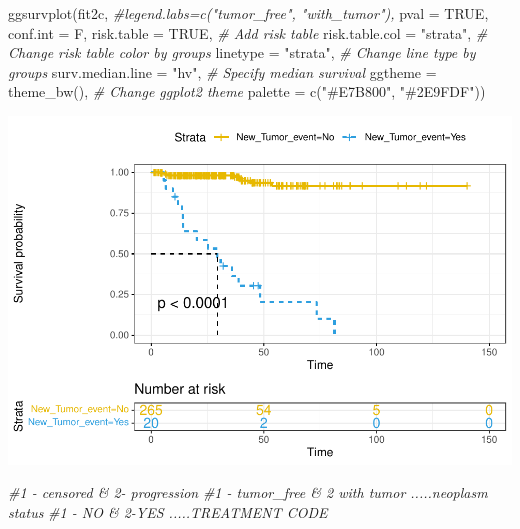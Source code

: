 \documentclass[
  11pt,
]{article}
\newenvironment{Shaded}{\begin{snugshade}}{\end{snugshade}}
\newcommand{\AttributeTok}[1]{\textcolor[rgb]{0.77,0.63,0.00}{#1}}
\newcommand{\CommentTok}[1]{\textcolor[rgb]{0.56,0.35,0.01}{\textit{#1}}}
\newcommand{\ConstantTok}[1]{\textcolor[rgb]{0.00,0.00,0.00}{#1}}
\newcommand{\FunctionTok}[1]{\textcolor[rgb]{0.00,0.00,0.00}{#1}}
\newcommand{\NormalTok}[1]{#1}
\newcommand{\StringTok}[1]{\textcolor[rgb]{0.31,0.60,0.02}{#1}}
\begin{document}
\begin{Shaded}
\begin{Highlighting}[]
\FunctionTok{ggsurvplot}\NormalTok{(fit2c,}
          \CommentTok{\#legend.labs=c("tumor\_free", "with\_tumor"),}
          \AttributeTok{pval =} \ConstantTok{TRUE}\NormalTok{, }\AttributeTok{conf.int =}\NormalTok{ F,}
          \AttributeTok{risk.table =} \ConstantTok{TRUE}\NormalTok{, }\CommentTok{\# Add risk table}
          \AttributeTok{risk.table.col =} \StringTok{"strata"}\NormalTok{, }\CommentTok{\# Change risk table color by groups}
          \AttributeTok{linetype =} \StringTok{"strata"}\NormalTok{, }\CommentTok{\# Change line type by groups}
          \AttributeTok{surv.median.line =} \StringTok{"hv"}\NormalTok{, }\CommentTok{\# Specify median survival}
          \AttributeTok{ggtheme =} \FunctionTok{theme\_bw}\NormalTok{(), }\CommentTok{\# Change ggplot2 theme}
          \AttributeTok{palette =} \FunctionTok{c}\NormalTok{(}\StringTok{"\#E7B800"}\NormalTok{, }\StringTok{"\#2E9FDF"}\NormalTok{))}
\end{Highlighting}
\end{Shaded}

\includegraphics{new_surv_3_files/figure-latex/unnamed-chunk-10-1.pdf}

\begin{Shaded}
\begin{Highlighting}[]
\CommentTok{\#1 {-} censored \& 2{-} progression}
\CommentTok{\#1 {-} tumor\_free \& 2 with tumor .....neoplasm status }
\CommentTok{\#1 {-} NO \& 2{-}YES .....TREATMENT CODE}
\end{Highlighting}
\end{Shaded}
\end{document}

